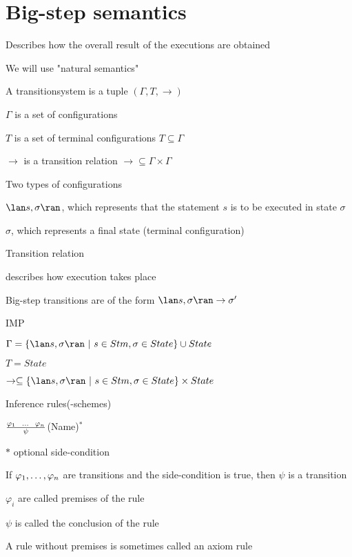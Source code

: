\section{Big-step semantics}
\enumstart
	\item Describes how the overall result of the executions are obtained
	\item We will use "natural semantics"
	\item A transitionsystem is a tuple $(\Gamma, T, \rightarrow)$
	\enumstart
		\item $\Gamma$ is a set of configurations
		\item $T$ is a set of terminal configurations $T \subseteq \Gamma$
		\item $\rightarrow$ is a transition relation $\rightarrow \subseteq \Gamma \times \Gamma$
	\enumend
	\item Two types of configurations
	\enumstart
		\item $\lan s, \sigma \ran$, which represents that the statement $s$ is to be executed in state $\sigma$
		\item $\sigma$, which represents a final state (terminal configuration)
	\enumend
	\item Transition relation
	\enumstart
		\item describes how execution takes place
		\item Big-step transitions are of the form $\lan s, \sigma \ran \rightarrow \sigma'$
	\enumend
	\item IMP
	\enumstart
		\item $\Gamma = \{ \lan s, \sigma \ran \ | \ s \in Stm, \sigma \in State\} \cup State $
		\item $T = State$
		\item $\rightarrow \subseteq \{ \lan s, \sigma \ran \ | \ s \in Stm, \sigma \in State\} \times State$
	\enumend
	\item Inference rules(-schemes)
	\enumstart
		\item $\frac{\varphi_1 \ \ \mathellipsis \ \ \varphi_n}{\psi}$(Name)$^*$
		\item $*$ optional side-condition
		\item If $\varphi_1, \mathellipsis, \varphi_n$ are transitions and the side-condition is true, then $\psi$ is a transition
		\item $\varphi_i$ are called premises of the rule
		\item $\psi$ is called the conclusion of the rule
		\item A rule without premises is sometimes called an axiom rule
